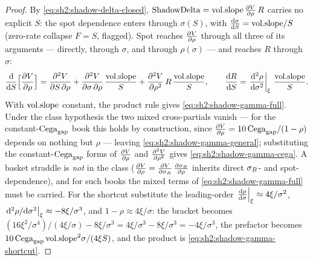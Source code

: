 \begin{proof}
By \eqref{eq:sh2:shadow-delta-closed}, $\mathrm{ShadowDelta} = \mathrm{vol.slope}\,
\frac{\partial V}{\partial \rho}\, R$ carries no explicit $S$: the spot dependence enters
through $\sigma(S)$, with $\frac{\mathrm{d} \sigma}{\mathrm{d} S} = \mathrm{vol.slope}/S$ (zero-rate
collapse $F = S$, flagged). Spot reaches $\frac{\partial V}{\partial \rho}$ through all three
of its arguments --- directly, through $\sigma$, and through
$\rho(\sigma)$ --- and reaches $R$ through $\sigma$:
\[
  \frac{\mathrm{d} }{\mathrm{d} S}\Bigl[\frac{\partial V}{\partial \rho}\Bigr]
  = \frac{\partial^2 V}{\partial S\,\partial \rho}
    + \frac{\partial^2 V}{\partial \sigma\,\partial \rho}\,\frac{\mathrm{vol.slope}}{S}
    + \frac{\partial^2 V}{\partial \rho^2}\, R\, \frac{\mathrm{vol.slope}}{S},
  \qquad
  \frac{\mathrm{d} R}{\mathrm{d} S}
  = \left.\frac{\mathrm{d}^2\rho}{\mathrm{d}\sigma^2}\right|_{\xi}\,\frac{\mathrm{vol.slope}}{S}.
\]
With $\mathrm{vol.slope}$ constant, the product rule gives
\eqref{eq:sh2:shadow-gamma-full}. Under the class hypothesis the two
mixed cross-partials vanish --- for the constant-$\mathrm{Cega}_{\mathrm{gap}}$ book this
holds by construction, since $\frac{\partial V}{\partial \rho} = 10\,\mathrm{Cega}_{\mathrm{gap}}/(1 - \rho)$
depends on nothing but $\rho$ --- leaving
\eqref{eq:sh2:shadow-gamma-general}; substituting the constant-$\mathrm{Cega}_{\mathrm{gap}}$
forms of $\frac{\partial V}{\partial \rho}$ and $\frac{\partial^2 V}{\partial \rho^2}$ gives
\eqref{eq:sh2:shadow-gamma-cega}. A basket straddle is \emph{not} in the
class ($\frac{\partial V}{\partial \rho} = \frac{\partial V}{\partial \sigma_B}\,\frac{\partial \sigma_B}{\partial \rho}$ inherits direct
$\sigma_B$- and spot-dependence), and for such books the mixed terms of
\eqref{eq:sh2:shadow-gamma-full} must be carried. For the shortcut
substitute the
leading-order $\left.\frac{\mathrm{d} \rho}{\mathrm{d} \sigma}\right|_{\xi} \approx 4\xi/\sigma^2$,
$\left.\mathrm{d}^2\rho/\mathrm{d}\sigma^2\right|_{\xi} \approx -8\xi/\sigma^3$, and
$1 - \rho \approx 4\xi/\sigma$: the bracket becomes
$(16\xi^2/\sigma^4)/(4\xi/\sigma) - 8\xi/\sigma^3
= 4\xi/\sigma^3 - 8\xi/\sigma^3 = -4\xi/\sigma^3$, the prefactor becomes
$10\,\mathrm{Cega}_{\mathrm{gap}}\,\mathrm{vol.slope}^2 \sigma/(4\xi S)$, and the product is
\eqref{eq:sh2:shadow-gamma-shortcut}.
\end{proof}


